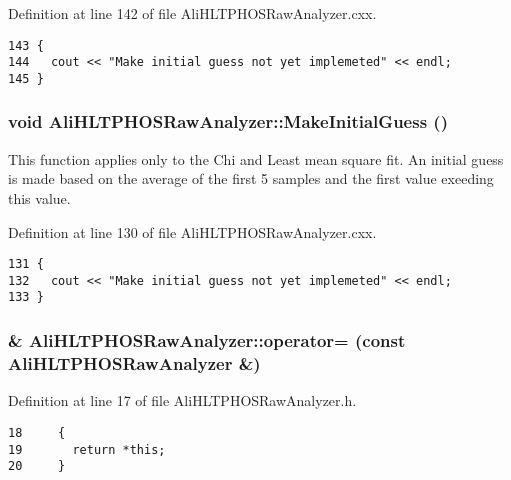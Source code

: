 Definition at line 142 of file Ali\-HLTPHOSRaw\-Analyzer.cxx.

\footnotesize\begin{verbatim}143 {
144   cout << "Make initial guess not yet implemeted" << endl;  
145 }
\end{verbatim}\normalsize 


\subsubsection{\setlength{\rightskip}{0pt plus 5cm}void Ali\-HLTPHOSRaw\-Analyzer::Make\-Initial\-Guess ()}\label{classAliHLTPHOSRawAnalyzer_a13}


This function applies only to the Chi and Least mean square fit. An initial guess is made based on the average of the first 5 samples and the first value exeeding this value. 

Definition at line 130 of file Ali\-HLTPHOSRaw\-Analyzer.cxx.

\footnotesize\begin{verbatim}131 {
132   cout << "Make initial guess not yet implemeted" << endl;
133 }
\end{verbatim}\normalsize 


\subsubsection{\& Ali\-HLTPHOSRaw\-Analyzer::operator= (const {\bf Ali\-HLTPHOSRaw\-Analyzer} \&)\hspace{0.3cm}{\tt  [inline]}}\label{classAliHLTPHOSRawAnalyzer_a4}




Definition at line 17 of file Ali\-HLTPHOSRaw\-Analyzer.h.

\footnotesize\begin{verbatim}18     {
19       return *this;
20     }
\end{verbatim}\normalsize 


